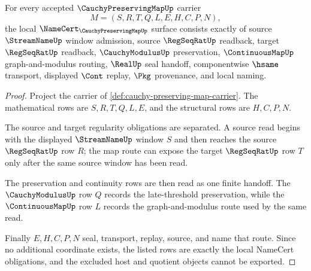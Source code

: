 \begin{theorem}
\label{thm:cauchy-preserving-map-namecert-obligations}
For every accepted $\CauchyPreservingMapUp$ carrier
$$
M=(S,R,T,Q,L,E,H,C,P,N),
$$
the local $\NameCert_{\CauchyPreservingMapUp}$ surface consists exactly of source $\StreamNameUp$ window admission, source $\RegSeqRatUp$ readback, target $\RegSeqRatUp$ readback, $\CauchyModulusUp$ preservation, $\ContinuousMapUp$ graph-and-modulus routing, $\RealUp$ seal handoff, componentwise $\hsame$ transport, displayed $\Cont$ replay, $\Pkg$ provenance, and local naming.
\end{theorem}
\begin{proof}
Project the carrier of \autoref{def:cauchy-preserving-map-carrier}. The mathematical rows are $S,R,T,Q,L,E$, and the structural rows are $H,C,P,N$.

The source and target regularity obligations are separated. A source read begins with the displayed $\StreamNameUp$ window $S$ and then reaches the source $\RegSeqRatUp$ row $R$; the map route can expose the target $\RegSeqRatUp$ row $T$ only after the same source window has been read.

The preservation and continuity rows are then read as one finite handoff. The $\CauchyModulusUp$ row $Q$ records the late-threshold preservation, while the $\ContinuousMapUp$ row $L$ records the graph-and-modulus route used by the same read.

Finally $E,H,C,P,N$ seal, transport, replay, source, and name that route. Since no additional coordinate exists, the listed rows are exactly the local NameCert obligations, and the excluded host and quotient objects cannot be exported.
\end{proof}

